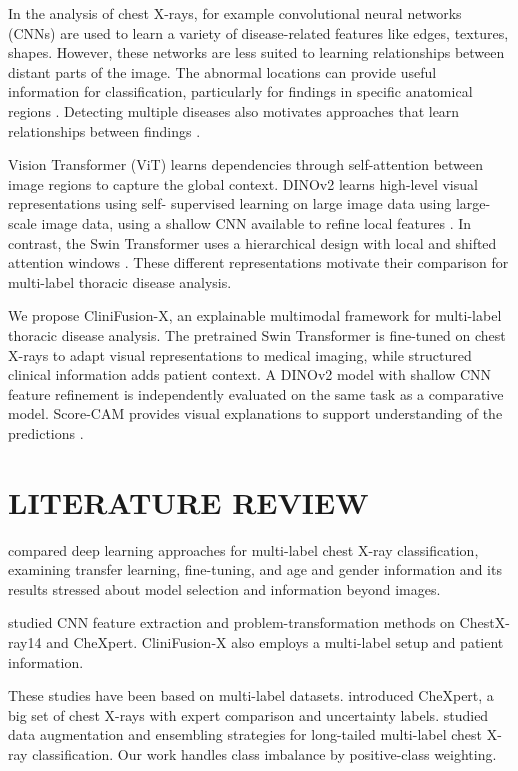 \documentclass[conference]{IEEEtran}
\begin{document}
In the analysis of chest X-rays, for example convolutional neural networks (CNNs) are used to learn a variety of disease-related features like edges, textures, shapes. However, these networks are less suited to learning relationships between distant parts of the image. The abnormal locations can provide useful information for classification, particularly for findings in specific anatomical regions \citep{guendel2018location}. Detecting multiple diseases also motivates approaches that learn relationships between findings \citep{pham2021interpreting}.

Vision Transformer (ViT) learns dependencies through self-attention
between image regions to capture the global context.
DINOv2 learns high-level visual representations using self-
supervised learning on large image data using large-scale image data, using a shallow CNN available to refine local features \citep{oquab2023dinov2}. In contrast, the Swin Transformer uses a hierarchical design with local and shifted attention windows \citep{liu2021swin}. These different representations motivate their comparison for multi-label thoracic disease analysis.

We propose CliniFusion-X, an explainable multimodal framework for multi-label thoracic disease analysis. The pretrained Swin Transformer is fine-tuned on chest X-rays to adapt visual representations to medical imaging, while structured clinical information adds patient context. A DINOv2 model with shallow CNN feature refinement is independently evaluated on the same task as a comparative model. Score-CAM provides visual explanations to support understanding of the predictions \citep{wang2020scorecam}.
\section{LITERATURE REVIEW}
\citet{baltruschat2019comparison} compared deep learning approaches for multi-label chest X-ray classification, examining transfer learning, fine-tuning, and age and gender information and its results stressed about model selection and information beyond images.

\citet{allaouzi2019multilabel} studied CNN feature extraction and problem-transformation methods on ChestX-ray14 and CheXpert. CliniFusion-X also employs a multi-label setup and patient information.

These studies have been based on multi-label datasets. \citet{irvin2019chexpert} introduced CheXpert, a big set of chest X-rays with expert comparison and uncertainty labels. \citet{nguyenmau2023longtailed} studied data augmentation and ensembling strategies for long-tailed multi-label chest X-ray classification. Our work handles class imbalance by positive-class weighting.
\end{document}
